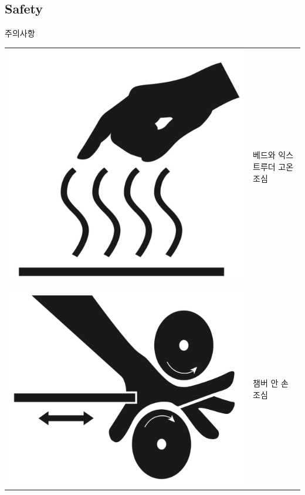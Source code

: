 \documentclass[11pt]{beamer}
\begin{document}
\subsection{Safety}
\begin{frame}[t]{주의사항}\footnotesize
\begin{tabular}{c l}
\includegraphics[width=0.4\textheight]{./image/15_01.png}&베드와 익스트루더 고온 조심\\ &\\
\includegraphics[width=0.4\textheight]{./image/15_02.png}&챔버 안 손 조심
\end{tabular}
\end{frame}
\end{document}
